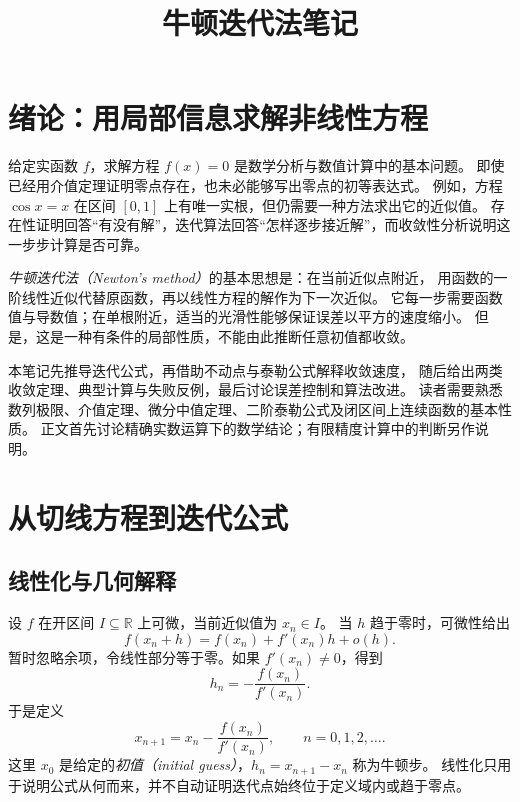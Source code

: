 \documentclass[UTF8,12pt,a4paper,fontset=fandol]{ctexart}
\title{牛顿迭代法笔记}
\author{}
\date{}
\begin{document}
\maketitle
\tableofcontents

\section{绪论：用局部信息求解非线性方程}
\label{sec:newton-introduction}

给定实函数 $f$，求解方程 $f(x)=0$ 是数学分析与数值计算中的基本问题。
即使已经用介值定理证明零点存在，也未必能够写出零点的初等表达式。
例如，方程 $\cos x=x$ 在区间 $[0,1]$ 上有唯一实根，但仍需要一种方法求出它的近似值。
存在性证明回答“有没有解”，迭代算法回答“怎样逐步接近解”，而收敛性分析说明这一步步计算是否可靠。

\emph{牛顿迭代法（Newton's method）}的基本思想是：在当前近似点附近，
用函数的一阶线性近似代替原函数，再以线性方程的解作为下一次近似。
它每一步需要函数值与导数值；在单根附近，适当的光滑性能够保证误差以平方的速度缩小。
但是，这是一种有条件的局部性质，不能由此推断任意初值都收敛。

本笔记先推导迭代公式，再借助不动点与泰勒公式解释收敛速度，
随后给出两类收敛定理、典型计算与失败反例，最后讨论误差控制和算法改进。
读者需要熟悉数列极限、介值定理、微分中值定理、二阶泰勒公式及闭区间上连续函数的基本性质。
正文首先讨论精确实数运算下的数学结论；有限精度计算中的判断另作说明。

\section{从切线方程到迭代公式}
\label{sec:newton-construction}

\subsection{线性化与几何解释}

设 $f$ 在开区间 $I\subseteq\mathbb R$ 上可微，当前近似值为 $x_n\in I$。
当 $h$ 趋于零时，可微性给出
\[
  f(x_n+h)=f(x_n)+f'(x_n)h+o(h).
\]
暂时忽略余项，令线性部分等于零。如果 $f'(x_n)\ne0$，得到
\[
  h_n=-\frac{f(x_n)}{f'(x_n)}.
\]
于是定义
\begin{equation}\label{eq:newton-iteration}
  x_{n+1}=x_n-\frac{f(x_n)}{f'(x_n)},\qquad n=0,1,2,\ldots.
\end{equation}
这里 $x_0$ 是给定的\emph{初值（initial guess）}，$h_n=x_{n+1}-x_n$ 称为牛顿步。
线性化只用于说明公式从何而来，并不自动证明迭代点始终位于定义域内或趋于零点。
\end{document}
